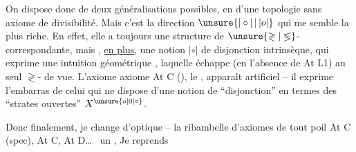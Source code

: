 On dispose donc de deux généralisations possibles, en  d'une topologie sans axiome de divisibilité. Mais c'est la direction $\unsure{|\circ|\,|\,|o|}$ qui me semble la plus riche. En effet, elle a toujours une structure de $\unsure{\gtrless|\lessgtr}$- correspondante, mais , \uline{en plus}, une notion $|\circ|$ de disjonction intrinsèque, qui exprime une intuition géométrique , laquelle échappe (en l'absence de At L1) au seul $\gtrless$- de vue. L'axiome axiome At C (),  le , apparaît artificiel -- il exprime l'embarras de celui qui ne dispose d'une notion de ``disjonction'' en termes des  ``strates ouvertes'' $X^{\unsure{o|0|\circ}}$.

Donc finalement, je change d'optique -- la ribambelle d'axiomes de tout poil At C (spec), At C, At D\ldots\   un  , Je reprends
